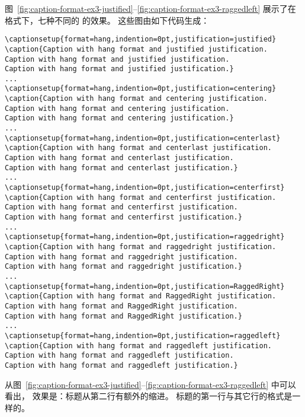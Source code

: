 图~\ref{fig:caption-format-ex3-justified}--\ref{fig:caption-format-ex3-raggedleft} 展示了在  格式下，七种不同的  的效果。
这些图由如下代码生成：
\begin{lstlisting}
\captionsetup{format=hang,indention=0pt,justification=justified}
\caption{Caption with hang format and justified justification.
Caption with hang format and justified justification.
Caption with hang format and justified justification.}
...
\captionsetup{format=hang,indention=0pt,justification=centering}
\caption{Caption with hang format and centering justification.
Caption with hang format and centering justification.
Caption with hang format and centering justification.}
...
\captionsetup{format=hang,indention=0pt,justification=centerlast}
\caption{Caption with hang format and centerlast justification.
Caption with hang format and centerlast justification.
Caption with hang format and centerlast justification.}
...
\captionsetup{format=hang,indention=0pt,justification=centerfirst}
\caption{Caption with hang format and centerfirst justification.
Caption with hang format and centerfirst justification.
Caption with hang format and centerfirst justification.}
...
\captionsetup{format=hang,indention=0pt,justification=raggedright}
\caption{Caption with hang format and raggedright justification.
Caption with hang format and raggedright justification.
Caption with hang format and raggedright justification.}
...
\captionsetup{format=hang,indention=0pt,justification=RaggedRight}
\caption{Caption with hang format and RaggedRight justification.
Caption with hang format and RaggedRight justification.
Caption with hang format and RaggedRight justification.}
...
\captionsetup{format=hang,indention=0pt,justification=raggedleft}
\caption{Caption with hang format and raggedleft justification.
Caption with hang format and raggedleft justification.
Caption with hang format and raggedleft justification.}
\end{lstlisting}
从图~\ref{fig:caption-format-ex3-justified}--\ref{fig:caption-format-ex3-raggedleft} 中可以看出，
 效果是：标题从第二行有额外的缩进。
标题的第一行与其它行的格式是一样的。

